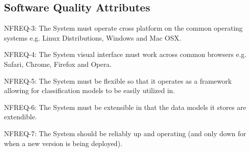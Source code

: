 \documentclass[11pt]{report}
\begin{document}
\subsection*{Software Quality Attributes}
NFREQ-3: The System must operate cross platform on the common operating systems e.g. Linux Distributions, Windows and Mac OSX.

NFREQ-4: The System visual interface must work across common browsers e.g. Safari, Chrome, Firefox and Opera.

NFREQ-5: The System must be flexible so that it operates as a framework allowing for classification models to be easily utilized in.

NFREQ-6: The System must be extensible in that the data models it stores are extendible.

NFREQ-7: The System should be reliably up and operating (and only down for when a new version is being deployed).
\end{document}
